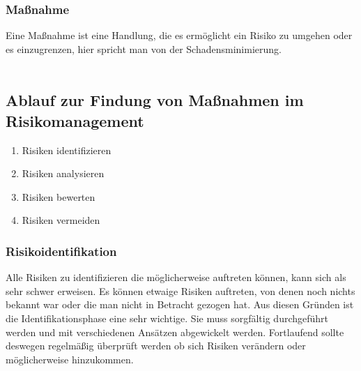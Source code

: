 \subsubsection{Maßnahme}
Eine Maßnahme ist eine Handlung, die es ermöglicht ein Risiko zu umgehen oder es einzugrenzen, hier spricht man von der Schadensminimierung. 
\\
\\
\subsection{Ablauf zur Findung von Maßnahmen im Risikomanagement}
\begin{enumerate}
    \item Risiken identifizieren
    \item Risiken analysieren
    \item Risiken bewerten
    \item Risiken vermeiden
\end{enumerate}

\subsubsection{Risikoidentifikation}
Alle Risiken zu identifizieren die möglicherweise auftreten können, kann sich als sehr schwer erweisen. Es können etwaige Risiken auftreten, von denen noch nichts bekannt war oder die man nicht in Betracht gezogen hat. Aus diesen Gründen ist die Identifikationsphase eine sehr wichtige. Sie muss sorgfältig durchgeführt werden und mit verschiedenen Ansätzen abgewickelt werden. Fortlaufend sollte deswegen regelmäßig überprüft werden ob sich Risiken verändern oder möglicherweise hinzukommen.
\\



